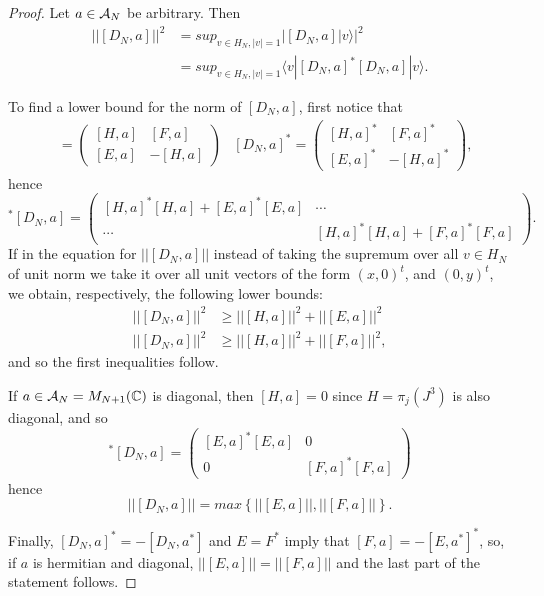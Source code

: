 \begin{proof}
Let $a \in \mathcal A_N$ be arbitrary. Then
\begin{align*}
    ||[D_N, a]||^2 
        &= sup_{v \in H_N, |v| = 1} |[D_N, a] | v \rangle|^2 \\
        &= sup_{v \in H_N, |v| = 1} \langle v | [D_N, a]^* [D_N, a] | v \rangle.
\end{align*}

To find a lower bound for the norm of $[D_N, a]$, first notice that 
\begin{align*}
    [D_N, a] &= \begin{pmatrix} [H, a] & [F, a] \\ [E, a] & -[H, a] \end{pmatrix}&
    [D_N, a]^* = \begin{pmatrix} [H, a]^* & [F, a]^* \\ [E, a]^* & -[H, a]^* \end{pmatrix},
\end{align*} hence
\begin{equation*}
    [D_N, a]^* [D_N, a] 
    = \begin{pmatrix}
    [H, a]^*[H, a] + [E, a]^*[E, a] & \cdots \\
    \cdots & [H, a]^*[H, a] + [F, a]^*[F, a]
    \end{pmatrix}.
\end{equation*}
If in the equation for $||[D_N, a]||$ instead of taking the supremum over all $v \in H_N$ of unit norm we take it over all unit vectors of the form $(x, 0)^t$, and $(0, y)^t$, we obtain, respectively, the following lower bounds:
\begin{align}
    ||[D_N, a]||^2 &\geq ||[H, a]||^2 + ||[E, a]||^2 \\
    ||[D_N, a]||^2 &\geq ||[H, a]||^2 + ||[F, a]||^2,
\end{align}
and so the first inequalities follow.

If $a \in \mathcal A_N = M_{N+1}(\mathbb{C})$ is diagonal, then $[H, a] = 0$ since $H = \pi_j(J^3)$ is also diagonal, and so
\begin{equation*}
    [D_N, a]^* [D_N, a] 
    = \begin{pmatrix}
    [E, a]^*[E, a] & 0 \\
    0 & [F, a]^*[F, a]
    \end{pmatrix}
\end{equation*}
hence
\begin{equation}
    ||[D_N, a]|| = max\left\{ ||[E, a]||, ||[F, a]|| \right\}.
\end{equation}

Finally, $[D_N, a]^* = -[D_N, a^*]$ and $E = F^*$ imply that $[F, a] = - [E, a^*]^*$, so, if $a$ is hermitian and diagonal, $||[E, a]|| = ||[F, a]||$ and the last part of the statement follows.
\end{proof}

